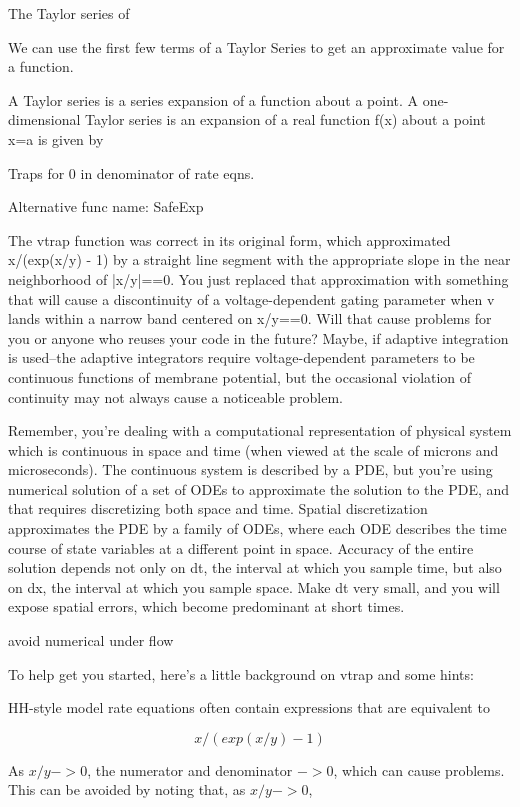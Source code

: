 The Taylor series of

We can use the first few terms of a Taylor Series to get an approximate value for a function.


A Taylor series is a series expansion of a function about a point. A one-dimensional Taylor series is an expansion of a real function f(x) about a point x=a is given by


Traps for 0 in denominator of rate eqns. 

Alternative func name: SafeExp


The vtrap function was correct in its original form, which approximated x/(exp(x/y) - 1) by a straight line segment with the appropriate slope in the near neighborhood of |x/y|==0. You just replaced that approximation with something that will cause a discontinuity of a voltage-dependent gating parameter when v lands within a narrow band centered on x/y==0. Will that cause problems for you or anyone who reuses your code in the future? Maybe, if adaptive integration is used--the adaptive integrators require voltage-dependent parameters to be continuous functions of membrane potential, but the occasional violation of continuity may not always cause a noticeable problem.


Remember, you're dealing with a computational representation of physical system which is continuous in space and time (when viewed at the scale of microns and microseconds). The continuous system is described by a PDE, but you're using numerical solution of a set of ODEs to approximate the solution to the PDE, and that requires discretizing both space and time. Spatial discretization approximates the PDE by a family of ODEs, where each ODE describes the time course of state variables at a different point in space. Accuracy of the entire solution depends not only on dt, the interval at which you sample time, but also on dx, the interval at which you sample space. Make dt very small, and you will expose spatial errors, which become predominant at short times.

avoid numerical under flow

To help get you started, here's a little background on vtrap and some hints:

HH-style model rate equations often contain expressions that are equivalent to

$$x / (exp(x/y) - 1)$$

As $x/y -> 0$, the numerator and denominator $-> 0$, which can cause problems.
This can be avoided by noting that, as $x/y -> 0$,

